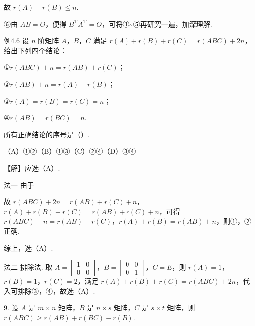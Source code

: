 \begin{fnote}

故 $r(A)+r(B)\le n$.

⑥由 $AB=O$，便得 $B^{\mathrm{T}}A^{\mathrm{T}}=O$，可将①\textasciitilde{}⑤再研究一遍，加深理解.
\end{fnote}

\begin{fcard}{例4.6}
设 $n$ 阶矩阵 $A$，$B$，$C$ 满足 $r(A)+r(B)+r(C)=r(ABC)+2n$，给出下列四个结论：

①$r(ABC)+n=r(AB)+r(C)$；

②$r(AB)+n=r(A)+r(B)$；

③$r(A)=r(B)=r(C)=n$；

④$r(AB)=r(BC)=n$.

所有正确结论的序号是（\quad）.

（A）①②\qquad（B）①③\qquad（C）②④\qquad（D）③④

【解】应选（A）.

法一 由于


故 $r(ABC)+2n=r(AB)+r(C)+n$，$r(A)+r(B)+r(C)=r(AB)+r(C)+n$，可得 $r(ABC)+n=r(AB)+r(C)$，$r(A)+r(B)=r(AB)+n$，则①，②正确.

综上，选（A）.

法二 排除法. 取 $A=\begin{bmatrix}1&0\\0&0\end{bmatrix}$，$B=\begin{bmatrix}0&0\\0&1\end{bmatrix}$，$C=E$，则 $r(A)=1$，$r(B)=1$，$r(C)=2$，满足 $r(A)+r(B)+r(C)=r(ABC)+2n$，代入可排除③，④，故选（A）.
\end{fcard}

9. 设 $A$ 是 $m\times n$ 矩阵，$B$ 是 $n\times s$ 矩阵，$C$ 是 $s\times t$ 矩阵，则 $r(ABC)\ge r(AB)+r(BC)-r(B)$.

